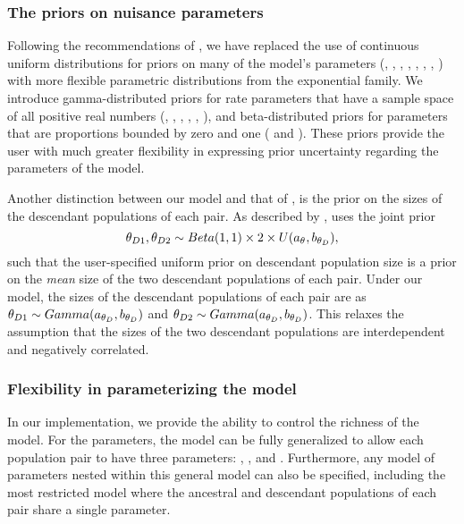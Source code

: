 \subsubsection*{The priors on nuisance parameters}
Following the recommendations of \citet{Oaks2012}, we have replaced the use of
continuous uniform distributions for priors on many of the
model's parameters (\divTime{}, \ancestralTheta{}, ,
, , ,
\recombinationRate, \migrationRate{}) with more flexible parametric
distributions from the exponential family.
We introduce gamma-distributed priors for rate parameters that have a sample
space of all positive real numbers (\divTime{}, \ancestralTheta{},
, , \recombinationRate,
\migrationRate{}), and beta-distributed priors for parameters that are
proportions bounded by zero and one ( and
).
These priors provide the user with much greater flexibility in expressing prior
uncertainty regarding the parameters of the model.

Another distinction between our model and that of \msb, is the prior on the
sizes of the descendant populations of each pair.
As described by \citet{Oaks2012}, \msb uses the joint prior
\begin{equation}
    \descendantTheta{1}{}, \descendantTheta{2}{} \sim
    Beta(1,1) \times 2 \times U(\uniformMin{\myTheta{}},
    \uniformMax{\descendantTheta{}{}}),
    \label{eq:jointThetaPrior}
\end{equation}
such that the user-specified uniform prior on descendant population
size is a prior on the \emph{mean} size of the two descendant
populations of each pair.
Under our model, the sizes of the descendant populations of each
pair are \iid as
$\descendantTheta{1}{} \sim Gamma(\gammaShape{\descendantTheta{}{}},
\gammaScale{\descendantTheta{}{}})$
and
$\descendantTheta{2}{} \sim Gamma(\gammaShape{\descendantTheta{}{}},
\gammaScale{\descendantTheta{}{}})$.
This relaxes the assumption that the sizes of the two descendant populations
are interdependent and negatively correlated.

\subsubsection*{Flexibility in parameterizing the model}
In our implementation, we provide the ability to control the richness of the
model.
For the \myTheta{} parameters, the model can be fully generalized to
allow each population pair to have three parameters:
\ancestralTheta{}, , and .
Furthermore, any model of \myTheta{} parameters nested within this
general model can also be specified, including the most restricted model
where the ancestral and descendant populations of each pair share
a single \myTheta{} parameter.


